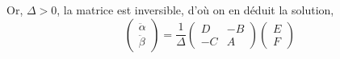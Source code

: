 \documentclass[10pt]{article}
\begin{document}
Or, $\Delta > 0$, la matrice est inversible, d'où on en déduit la solution,
\begin{equation}
\begin{pmatrix}
\ddot{\alpha} \\ \ddot{\beta}
\end{pmatrix}
=
\frac{1}{\Delta}
\begin{pmatrix}
D & -B \\ -C & A
\end{pmatrix}
\begin{pmatrix}
E \\ F 
\end{pmatrix}
\end{equation}
\end{document}
